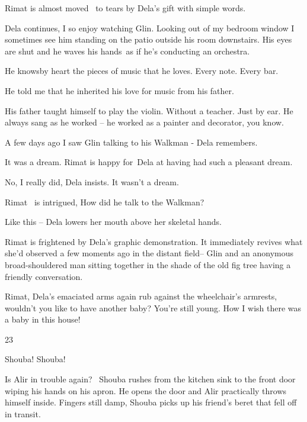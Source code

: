 \documentclass[letterpaper]{article}
\begin{document}
Rimat is almost moved \ to tears by Dela's gift with simple words.

Dela continues, {\textquotedbl}I so enjoy watching Glin. Looking out of my bedroom window I sometimes see him standing
on the patio outside his room downstairs. His eyes are shut and he waves his hands~as if he's conducting an
orchestra.{\textquotedbl} 

{\textquotedbl}He knowsby heart the pieces of music that he loves. Every note. Every bar.{\textquotedbl}

{\textquotedbl}He told me that he inherited his love for music from his father.{\textquotedbl}

{\textquotedbl}His father taught himself to play the violin. Without a teacher. Just by ear. He always sang as he worked
-- he worked as a painter and decorator, you know.{\textquotedbl}

{\textquotedbl}A few days ago I saw Glin talking to his Walkman -{\textquotedbl} Dela remembers. 

{\textquotedbl}It was a dream.{\textquotedbl} Rimat is happy for~Dela at having had such a pleasant dream.

{\textquotedbl}No, I really did,{\textquotedbl} Dela insists. {\textquotedbl}It wasn't a dream.{\textquotedbl}

Rimat ~is intrigued, {\textquotedbl}How did he talk to the Walkman?{\textquotedbl}

{\textquotedbl}Like this --{\textquotedbl} Dela lowers her mouth above her skeletal hands. 

Rimat is frightened by Dela's graphic demonstration. It immediately revives what she'd observed a few moments ago in the
distant field-- Glin and an anonymous broad-shouldered man sitting together in the shade of the old fig tree having a
friendly conversation.

{\textquotedbl}Rimat,{\textquotedbl} Dela's emaciated arms again rub against the wheelchair's armrests,
{\textquotedbl}wouldn't you like to have another baby? You're still young. How I wish there was a baby in this
house!{\textquotedbl}


\bigskip

23~

{\textquotedbl}Shouba! Shouba!{\textquotedbl}

Is Alir in trouble again?~ Shouba rushes from the kitchen sink to the front door wiping his hands on his apron. He opens
the door and Alir practically throws himself inside. Fingers still damp, Shouba picks up his friend's beret that fell
off in transit. 
\end{document}
